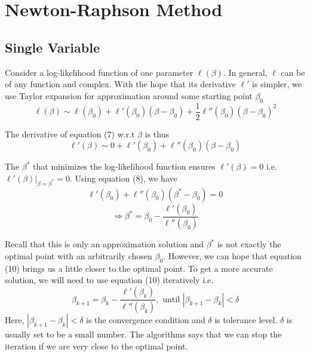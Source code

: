 \documentclass[12pt, oneside]{article}
\begin{document}
\section{Newton-Raphson Method}
\subsection{Single Variable}
Consider a log-likelihood function of one parameter ${\ell(\beta)}$. In general, $\ell$ can be of any function and complex. With the hope that its derivative $\ell'$ is simpler, we use Taylor expansion for approximation around some starting point $\beta_0$
\begin{equation}
\ell(\beta)\sim\ell(\beta_0)+\ell'(\beta_0)(\beta-\beta_0)+\frac{1}{2}\ell''(\beta_0)(\beta-\beta_0)^2
\end{equation}

The derivative of equation (7) w.r.t $\beta$ is thus
\begin{equation}
\ell'(\beta)\sim0+\ell'(\beta_0)+\ell''(\beta_0)(\beta-\beta_0)
\end{equation}


The $\beta^*$ that minimizes the log-likelihood function ensures $\ell'(\beta)=0$ i.e. ${\ell'(\beta)|_{\beta=\beta^*}=0}$. Using equation (8), we have
\begin{equation}
\ell'(\beta_0)+\ell''(\beta_0)(\beta^*-\beta_0)=0
\end{equation}
\begin{equation}
\Rightarrow\beta^*=\beta_0-\frac{\ell'(\beta_0)}{\ell''(\beta_0)}
\end{equation}

Recall that this is only an approximation solution and $\beta^*$ is not exactly the optimal point with an arbitrarily chosen $\beta_0$. However, we can hope that equation (10) brings us a little closer to the optimal point. To get a more accurate solution, we will need to use equation (10) iteratively i.e.
$$
\beta_{k+1}=\beta_k-\frac{\ell'(\beta_k)}{\ell''(\beta_k)}, \text { until } |\beta_{k+1}-\beta_{k}|<\delta
$$
Here, $|\beta_{k+1}-\beta_{k}|<\delta$ is the convergence condition and $\delta$ is tolerance level. $\delta$ is usually set to be a small number. The algorithms says that we can stop the iteration if we are very close to the optimal point.
\end{document}
